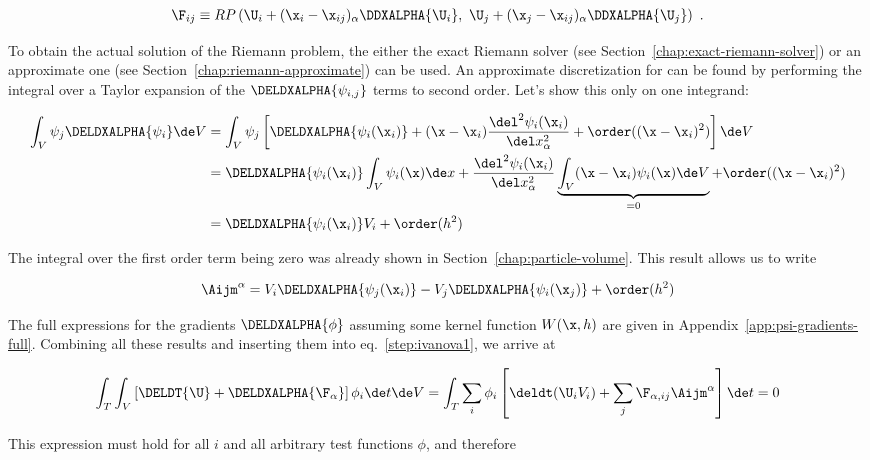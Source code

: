 \begin{align}
    \F_{ij}
    \equiv RP
    \left(\U_i + (\x_{i} - \x_{ij})_\alpha \DDXALPHA{\U_i}, \
    \U_j + (\x_{j} - \x_{ij})_\alpha \DDXALPHA{\U_j} \right) \ .
\end{align}

To obtain the actual solution of the Riemann problem, the either the exact Riemann solver (see Section~\ref{chap:exact-riemann-solver}) or an approximate one (see Section~\ref{chap:riemann-approximate}) can be used.
An approximate discretization for \Aij can be found by performing the integral over a Taylor
expansion of the $\DELDXALPHA{\psi_{i,j}}$ terms to second order. Let's show this only on one
integrand:

\begin{align}
    \int_V \psi_j \DELDXALPHA{\psi_i} \de V &=
    \int_V \psi_j \left[
        \DELDXALPHA{\psi_i(\x_i)}
        + (\x - \x_i) \frac{\del^2 \psi_i(\x_i)}{\del x_\alpha^2}
        + \order((\x - \x_i)^2)
    \right] \de V
\\
&= \DELDXALPHA{\psi_i(\x_i)} \int_V \psi_i(\x) \de x +
    \frac{\del^2 \psi_i(\x_i)}{\del x_\alpha^2}
        \underbrace{\int_V (\x - \x_i) \psi_i(\x) \de V}_{= 0}
    + \order((\x - \x_i)^2)
\\
&= \DELDXALPHA{\psi_i(\x_i)} V_i + \order(h^2)
\end{align}

The integral over the first order term being zero was already shown in
Section~\ref{chap:particle-volume}. This result allows us to write

\begin{align}
\Aijm^\alpha = V_i \DELDXALPHA{\psi_j(\x_i)} - V_j \DELDXALPHA{\psi_i(\x_j)} + \order(h^2)
\label{eq:IvanovaAij}
\end{align}

The full expressions for the gradients $\DELDXALPHA{\phi}$ assuming some kernel function $W(\x, h)$
are given in Appendix~\ref{app:psi-gradients-full}.
Combining all these results and inserting them into eq.~\ref{step:ivanova1}, we arrive at

\begin{align}
\int_T \int_V \left[ \DELDT{\U} + \DELDXALPHA{\F_\alpha} \right] \phi_i \de t \de V
= \int_T \sum_i \phi_i \left[ \deldt (\U_i V_i) + \sum_j \F_{\alpha,ij} \Aijm^\alpha \right] \de t =
0
\end{align}

This expression must hold for all $i$ and all arbitrary test functions $\phi$, and therefore

